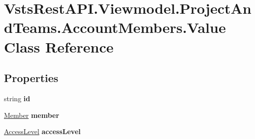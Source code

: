 \hypertarget{class_vsts_rest_a_p_i_1_1_viewmodel_1_1_project_and_teams_1_1_account_members_1_1_value}{}\section{Vsts\+Rest\+A\+P\+I.\+Viewmodel.\+Project\+And\+Teams.\+Account\+Members.\+Value Class Reference}
\label{class_vsts_rest_a_p_i_1_1_viewmodel_1_1_project_and_teams_1_1_account_members_1_1_value}
\subsection*{Properties}
\begin{DoxyCompactItemize}
\item 
\mbox{\label{class_vsts_rest_a_p_i_1_1_viewmodel_1_1_project_and_teams_1_1_account_members_1_1_value_a911ad756779568c5e9be66a5237c8672}} 
string {\bfseries id}
\item 
\mbox{\label{class_vsts_rest_a_p_i_1_1_viewmodel_1_1_project_and_teams_1_1_account_members_1_1_value_aa626210ffea01ca2863fccddd411e789}} 
\mbox{\hyperlink{class_vsts_rest_a_p_i_1_1_viewmodel_1_1_project_and_teams_1_1_account_members_1_1_member}{Member}} {\bfseries member}
\item 
\mbox{\label{class_vsts_rest_a_p_i_1_1_viewmodel_1_1_project_and_teams_1_1_account_members_1_1_value_a3411e097dddb65c626ef454bbb2a29d5}} 
\mbox{\hyperlink{class_vsts_rest_a_p_i_1_1_viewmodel_1_1_project_and_teams_1_1_account_members_1_1_access_level}{Access\+Level}} {\bfseries access\+Level}
\item 
\mbox{\label{class_vsts_rest_a_p_i_1_1_viewmodel_1_1_project_and_teams_1_1_account_members_1_1_value_ad438d502c7f30336aaf266d6e5ae4bcf}} 

\end{DoxyCompactItemize}
